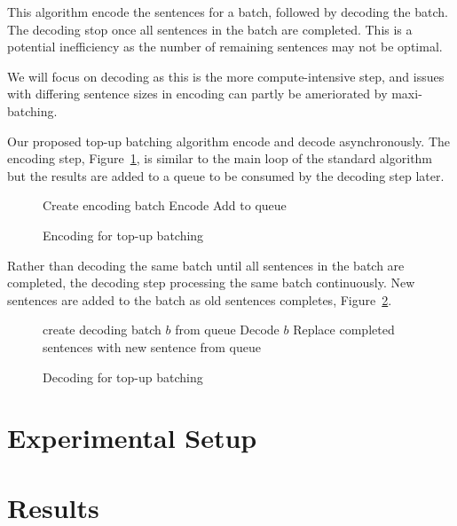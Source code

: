 \documentclass[]{article}
\begin{document}
This algorithm encode the sentences for a batch, followed by decoding the batch. The decoding stop once all sentences in the batch are completed. This is a potential inefficiency as the number of remaining sentences may not be optimal.

We will focus on decoding as this is the more compute-intensive step, and issues with differing sentence sizes in encoding can partly be ameriorated by maxi-batching.

Our proposed top-up batching algorithm encode and decode asynchronously. The encoding step, Figure~\ref{algo:Encoding for top-up batching}, is similar to the main loop of the standard algorithm but the results are added to a queue to be consumed by the decoding step later.

\begin{figure} [h]
\begin{algorithmic}
  \STATE Create encoding batch
  \STATE Encode
  \STATE Add to queue
\ENDWHILE 
\end{algorithmic}
\caption{Encoding for top-up batching}
\label{algo:Encoding for top-up batching}
\end{figure}

Rather than decoding the same batch until all sentences in the batch are completed, the decoding step processing the same batch continuously. New sentences are added to the batch as old sentences completes, Figure~\ref{algo:Decoding for top-up batching}.

\begin{figure} [h]
\begin{algorithmic}
\STATE create decoding batch $b$ from queue
  \STATE Decode $b$
  \STATE Replace completed sentences with new sentence from queue
\ENDWHILE 
\end{algorithmic}
\caption{Decoding for top-up batching}
\label{algo:Decoding for top-up batching}
\end{figure}


\section{Experimental Setup}
\label{sec:Experimental Setup}


\section{Results}
\label{sec:Results}
\end{document}
